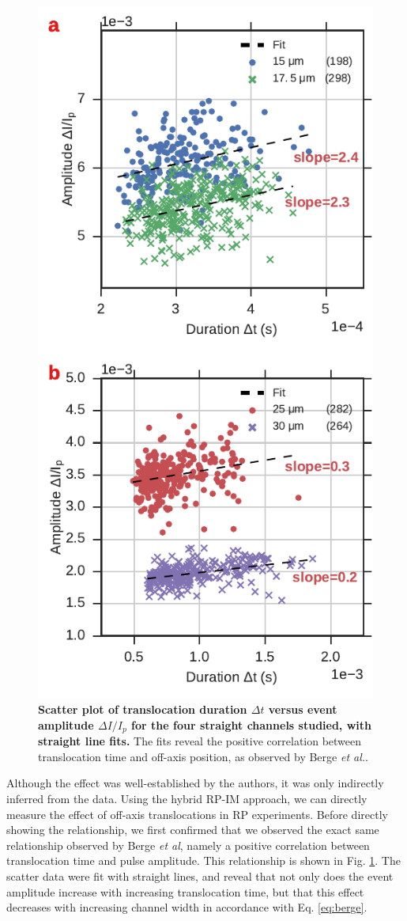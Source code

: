 				
				
				

				
				\begin{figure}
					\includegraphics[width=.5\textwidth]{dIdtstraight.pdf}
					\caption{\textbf{Scatter plot of translocation duration $\Delta t$ versus event amplitude $\Delta I/I_{p}$ for the four straight channels studied, with straight line fits.} The fits reveal the positive correlation between translocation time and off-axis position, as observed by Berge \emph{et al.}.}
					\label{fig:dIdtstraight}
				\end{figure}

				
				Although the effect was well-established by the authors, it was only indirectly inferred from the data. Using the hybrid RP-IM approach, we can directly measure the effect of off-axis translocations in RP experiments. Before directly showing the relationship, we first confirmed that we observed the exact same relationship observed by Berge \emph{et al}, namely a positive correlation between translocation time and pulse amplitude. This relationship is shown in Fig. \ref{fig:dIdtstraight}. The scatter data were fit with straight lines, and reveal that not only does the event amplitude increase with increasing translocation time, but that this effect decreases with increasing channel width in accordance with Eq. \ref{eq:berge}.
				
